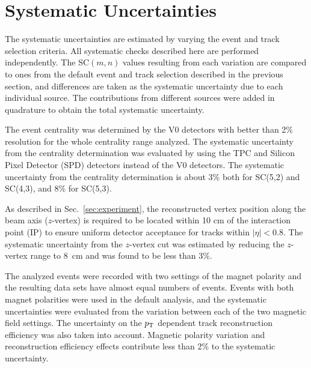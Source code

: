 \section{Systematic Uncertainties}
\label{sec:uncertainties}



The systematic uncertainties are estimated by varying the event and track selection criteria. All systematic checks described here are performed independently. 
The SC$(m,n)$ values resulting from each variation are compared to ones from the default event and track selection described in the previous section,
and differences are taken as the systematic uncertainty due to each individual source.
The contributions from different sources were added in quadrature to obtain the total systematic uncertainty.

The event centrality was determined by the V0 detectors \cite{Abbas:2013taa} with better than 2\%  resolution for the whole centrality range analyzed. The systematic uncertainty from the centrality determination was evaluated by using the TPC and Silicon Pixel Detector (SPD) \cite{Dellacasa:1999kf} detectors instead of the V0 detectors. The systematic uncertainty from the centrality determination is about 3\% both for SC(5,2) and SC(4,3), and 8\% for  SC(5,3).

As described in Sec.~\ref{sec:experiment}, the reconstructed vertex position along the beam axis ($z$-vertex) is required to be located within 10 cm of the interaction point (IP) to ensure uniform detector acceptance for tracks within $|\eta|<0.8$. The systematic uncertainty from the $z$-vertex cut was estimated by reducing the $z$-vertex range to 8~cm and was found to be less than 3\%.  

The analyzed events were recorded with two settings of the magnet polarity and the resulting data sets have almost equal numbers of events. Events with both magnet polarities were used in the default analysis, and the systematic uncertainties were evaluated from the variation between each of the two magnetic field settings. 
The uncertainty on the $p_{\rm T}$ dependent track reconstruction efficiency was also taken into account.
Magnetic polarity variation and reconstruction efficiency effects contribute less than 2\% to the systematic uncertainty.

